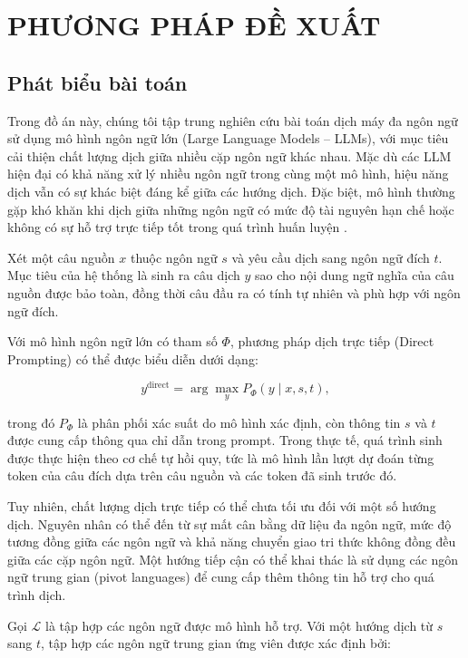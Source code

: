 
\section{PHƯƠNG PHÁP ĐỀ XUẤT}

\subsection{Phát biểu bài toán}

Trong đồ án này, chúng tôi tập trung nghiên cứu bài toán dịch máy đa ngôn ngữ sử dụng mô hình ngôn ngữ lớn (Large Language Models -- LLMs), với mục tiêu cải thiện chất lượng dịch giữa nhiều cặp ngôn ngữ khác nhau. Mặc dù các LLM hiện đại có khả năng xử lý nhiều ngôn ngữ trong cùng một mô hình, hiệu năng dịch vẫn có sự khác biệt đáng kể giữa các hướng dịch. Đặc biệt, mô hình thường gặp khó khăn khi dịch giữa những ngôn ngữ có mức độ tài nguyên hạn chế hoặc không có sự hỗ trợ trực tiếp tốt trong quá trình huấn luyện \cite{zhu-etal-2024-multilingual}.

Xét một câu nguồn $x$ thuộc ngôn ngữ $s$ và yêu cầu dịch sang ngôn ngữ đích $t$. Mục tiêu của hệ thống là sinh ra câu dịch $y$ sao cho nội dung ngữ nghĩa của câu nguồn được bảo toàn, đồng thời câu đầu ra có tính tự nhiên và phù hợp với ngôn ngữ đích.

Với mô hình ngôn ngữ lớn có tham số $\Phi$, phương pháp dịch trực tiếp (Direct Prompting) có thể được biểu diễn dưới dạng:

\begin{equation}
	y^{\mathrm{direct}}
	=
	\arg\max_y P_{\Phi}(y\mid x,s,t),
\end{equation}

trong đó $P_{\Phi}$ là phân phối xác suất do mô hình xác định, còn thông tin $s$ và $t$ được cung cấp thông qua chỉ dẫn trong prompt. Trong thực tế, quá trình sinh được thực hiện theo cơ chế tự hồi quy, tức là mô hình lần lượt dự đoán từng token của câu đích dựa trên câu nguồn và các token đã sinh trước đó.

Tuy nhiên, chất lượng dịch trực tiếp có thể chưa tối ưu đối với một số hướng dịch. Nguyên nhân có thể đến từ sự mất cân bằng dữ liệu đa ngôn ngữ, mức độ tương đồng giữa các ngôn ngữ và khả năng chuyển giao tri thức không đồng đều giữa các cặp ngôn ngữ. Một hướng tiếp cận có thể khai thác là sử dụng các ngôn ngữ trung gian (pivot languages) để cung cấp thêm thông tin hỗ trợ cho quá trình dịch.

Gọi $\mathcal{L}$ là tập hợp các ngôn ngữ được mô hình hỗ trợ. Với một hướng dịch từ $s$ sang $t$, tập hợp các ngôn ngữ trung gian ứng viên được xác định bởi:

